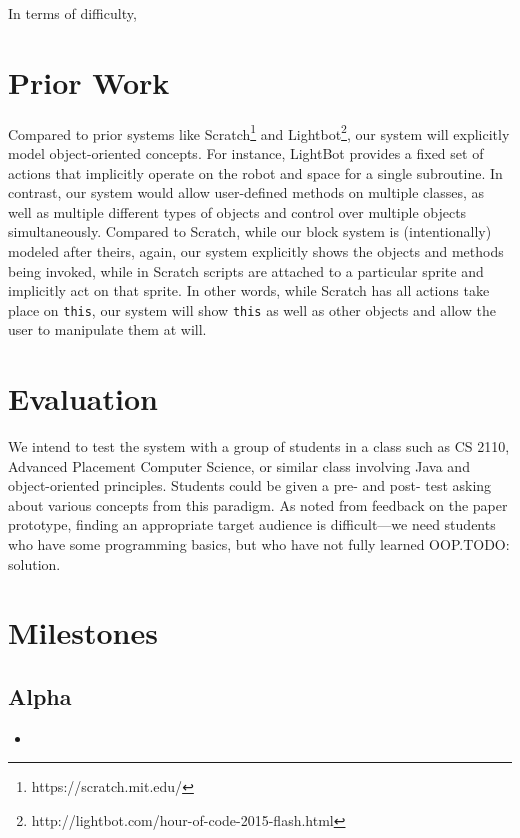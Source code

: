 \documentclass[12pt,notitlepage]{article}
\begin{document}
In terms of difficulty,

\section{Prior Work}

Compared to prior systems like
Scratch\footnote{https://scratch.mit.edu/} and
Lightbot\footnote{http://lightbot.com/hour-of-code-2015-flash.html},
our system will explicitly model object-oriented concepts. For
instance, LightBot provides a fixed set of actions that implicitly
operate on the robot and space for a single subroutine. In contrast,
our system would allow user-defined methods on multiple classes, as
well as multiple different types of objects and control over multiple
objects simultaneously. Compared to Scratch, while our block system is
(intentionally) modeled after theirs, again, our system explicitly
shows the objects and methods being invoked, while in Scratch scripts
are attached to a particular sprite and implicitly act on that
sprite. In other words, while Scratch has all actions take place on
\texttt{this}, our system will show \texttt{this} as well as other
objects and allow the user to manipulate them at will.

\section{Evaluation}

We intend to test the system with a group of students in a class such
as CS 2110, Advanced Placement Computer Science, or similar class
involving Java and object-oriented principles. Students could be given
a pre- and post- test asking about various concepts from this
paradigm. As noted from feedback on the paper prototype, finding an
appropriate target audience is difficult---we need students who have
some programming basics, but who have not fully learned OOP.\@ TODO:
solution.

\section{Milestones}

\subsection{Alpha}

\begin{itemize}
\item
\end{itemize}
\end{document}
